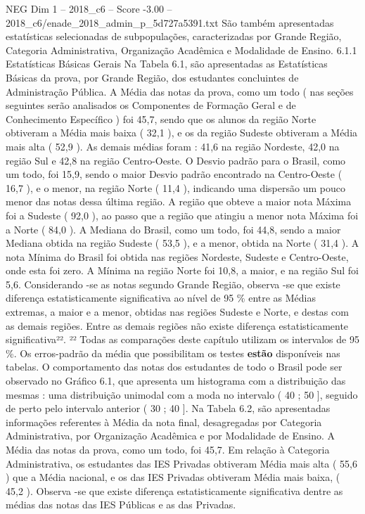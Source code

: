 \begin{textsample}{NEG Dim 1 – 2018\_c6 – Score -3.00 – 2018\_c6/enade\_2018\_admin\_p\_5d727a5391.txt}
São também apresentadas estatísticas selecionadas de subpopulações, caracterizadas por Grande Região, Categoria Administrativa, Organização Acadêmica e Modalidade de Ensino. 6.1.1 Estatísticas Básicas Gerais Na Tabela 6.1, são apresentadas as Estatísticas Básicas da prova, por Grande Região, dos estudantes concluintes de Administração Pública.
A Média das notas da prova, como um todo ( nas seções seguintes serão analisados os Componentes de Formação Geral e de Conhecimento Específico ) foi 45,7, sendo que os alunos da região Norte obtiveram a Média mais baixa ( 32,1 ), e os da região Sudeste obtiveram a Média mais alta ( 52,9 ).
As demais médias foram : 41,6 na região Nordeste, 42,0 na região Sul e 42,8 na região Centro-Oeste.
O Desvio padrão para o Brasil, como um todo, foi 15,9, sendo o maior Desvio padrão encontrado na Centro-Oeste ( 16,7 ), e o menor, na região Norte ( 11,4 ), indicando uma dispersão um pouco menor das notas dessa última região.
A região que obteve a maior nota Máxima foi a Sudeste ( 92,0 ), ao passo que a região que atingiu a menor nota Máxima foi a Norte ( 84,0 ).
A Mediana do Brasil, como um todo, foi 44,8, sendo a maior Mediana obtida na região Sudeste ( 53,5 ), e a menor, obtida na Norte ( 31,4 ).
A nota Mínima do Brasil foi obtida nas regiões Nordeste, Sudeste e Centro-Oeste, onde esta foi zero.
A Mínima na região Norte foi 10,8, a maior, e na região Sul foi 5,6.
Considerando -se as notas segundo Grande Região, observa -se que existe diferença estatisticamente significativa ao nível de 95 \% entre as Médias extremas, a maior e a menor, obtidas nas regiões Sudeste e Norte, e destas com as demais regiões.
Entre as demais regiões não existe diferença estatisticamente significativa²². ²² Todas as comparações deste capítulo utilizam os intervalos de 95 \%.
Os erros-padrão da média que possibilitam os testes \textbf{estão} disponíveis nas tabelas.
O comportamento das notas dos estudantes de todo o Brasil pode ser observado no Gráfico 6.1, que apresenta um histograma com a distribuição das mesmas : uma distribuição unimodal com a moda no intervalo ( 40 ; 50 ], seguido de perto pelo intervalo anterior ( 30 ; 40 ].
Na Tabela 6.2, são apresentadas informações referentes à Média da nota final, desagregadas por Categoria Administrativa, por Organização Acadêmica e por Modalidade de Ensino.
A Média das notas da prova, como um todo, foi 45,7.
Em relação à Categoria Administrativa, os estudantes das IES Privadas obtiveram Média mais alta ( 55,6 ) que a Média nacional, e os das IES Privadas obtiveram Média mais baixa, ( 45,2 ).
Observa -se que existe diferença estatisticamente significativa dentre as médias das notas das IES Públicas e as das Privadas.

\end{textsample}
